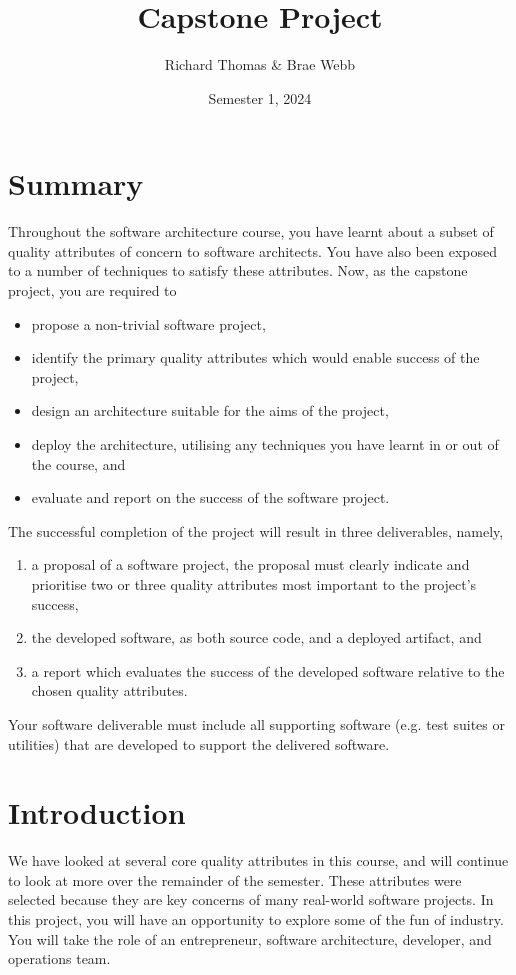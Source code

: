 \documentclass{csse4400}
\title{Capstone Project}
\author{Richard Thomas \& Brae Webb}
\date{Semester 1, 2024}
\begin{document}

\maketitle

\section*{Summary}
Throughout the software architecture course,
you have learnt about a subset of quality attributes of concern to software architects.
You have also been exposed to a number of techniques to satisfy these attributes.
Now, as the capstone project, you are required to
\begin{itemize}
    \item propose a non-trivial software project,
    \item identify the primary quality attributes which would enable success of the project,
    \item design an architecture suitable for the aims of the project,
    \item deploy the architecture, utilising any techniques you have learnt in or out of the course, and
    \item evaluate and report on the success of the software project.
\end{itemize}

\noindent
The successful completion of the project will result in three deliverables, namely,
\begin{enumerate}[label=\roman*]
    \item a proposal of a software project, the proposal must clearly indicate and prioritise two or three quality attributes most important to the project's success,
    \item the developed software, as both source code, and a deployed artifact, and
    \item a report which evaluates the success of the developed software relative to the chosen quality attributes.
\end{enumerate}

\noindent
Your software deliverable must include all supporting software (e.g. test suites or utilities) that are developed to support the delivered software.


\section{Introduction}
We have looked at several core quality attributes in this course, and will continue to look at more over the remainder of the semester.
These attributes were selected because they are key concerns of many real-world software projects.
In this project, you will have an opportunity to explore some of the fun of industry.
You will take the role of an entrepreneur, software architecture, developer, and operations team.
\end{document}
